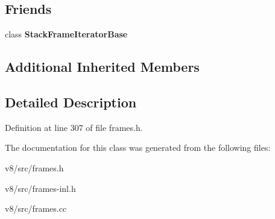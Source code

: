 \subsection*{Friends}
\begin{DoxyCompactItemize}
\item 
\mbox{\label{classv8_1_1internal_1_1NativeFrame_ac7310421866976ca454bbe11c5f926c3}} 
class {\bfseries Stack\+Frame\+Iterator\+Base}
\end{DoxyCompactItemize}
\subsection*{Additional Inherited Members}


\subsection{Detailed Description}


Definition at line 307 of file frames.\+h.



The documentation for this class was generated from the following files\+:\begin{DoxyCompactItemize}
\item 
v8/src/frames.\+h\item 
v8/src/frames-\/inl.\+h\item 
v8/src/frames.\+cc\end{DoxyCompactItemize}
